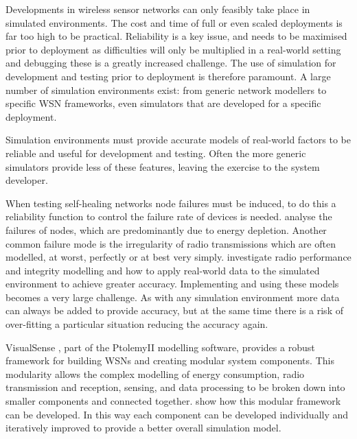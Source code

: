 \documentclass[authoryearcitations]{UoYCSproject}
\begin{document}
Developments in wireless sensor networks can only feasibly take place in simulated environments. The cost and time of full or even scaled deployments is far too high to be practical. Reliability is a key issue, and needs to be maximised prior to deployment as difficulties will only be multiplied in a real-world setting and debugging these is a greatly increased challenge. The use of simulation for development and testing prior to deployment is therefore paramount. A large number of simulation environments exist: from generic network modellers to specific WSN frameworks, even simulators that are developed for a specific deployment. \citep{Egea-Lopez2005, Musznicki2012}


Simulation environments must provide accurate models of real-world factors to be reliable and useful for development and testing. Often the more generic simulators provide less of these features, leaving the exercise to the system developer.


When testing self-healing networks node failures must be induced, to do this a reliability function to control the failure rate of devices is needed. \citet{Lee2004} analyse the failures of nodes, which are predominantly due to energy depletion. Another common failure mode is the irregularity of radio transmissions which are often modelled, at worst, perfectly or at best very simply. \citet{Zhou2004} investigate radio performance and integrity modelling and how to apply real-world data to the simulated environment to achieve greater accuracy. Implementing and using these models becomes a very large challenge. As with any simulation environment more data can always be added to provide accuracy, but at the same time there is a risk of over-fitting a particular situation reducing the accuracy again.

VisualSense \citep{Baldwin2005}, part of the PtolemyII modelling software, provides a robust framework for building WSNs and creating modular system components. This modularity allows the complex modelling of energy consumption, radio transmission and reception, sensing, and data processing to be broken down into smaller components and connected together. \citet{Rosello2009} show how this modular framework can be developed. In this way each component can be developed individually and iteratively improved to provide a better overall simulation model.
\end{document}
